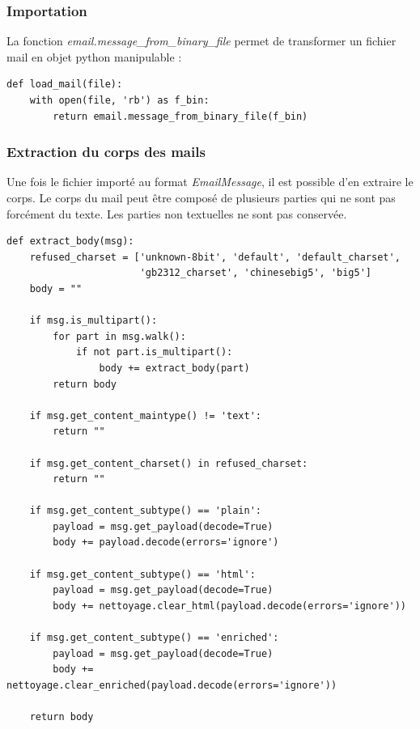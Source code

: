	\subsubsection{Importation}
		La fonction \emph{email.message\_from\_binary\_file} permet de transformer un fichier mail en objet python manipulable :
		\begin{lstlisting}[title=Fonction d'importation des fichiers,label={lst:import_file}]
def load_mail(file):
    with open(file, 'rb') as f_bin:
        return email.message_from_binary_file(f_bin)
		\end{lstlisting}

    \subsubsection{Extraction du corps des mails}
		Une fois le fichier importé au format \emph{EmailMessage}, il est possible d'en extraire le corps.
		Le corps du mail peut être composé de plusieurs parties qui ne sont pas forcément du texte.
		Les parties non textuelles ne sont pas conservée.

		\begin{lstlisting}[title=Extraction du corps du mail,label={lst:extract_corps}]
def extract_body(msg):
    refused_charset = ['unknown-8bit', 'default', 'default_charset',
                       'gb2312_charset', 'chinesebig5', 'big5']
    body = ""

    if msg.is_multipart():
        for part in msg.walk():
            if not part.is_multipart():
                body += extract_body(part)
        return body

    if msg.get_content_maintype() != 'text':
        return ""

    if msg.get_content_charset() in refused_charset:
        return ""

    if msg.get_content_subtype() == 'plain':
        payload = msg.get_payload(decode=True)
        body += payload.decode(errors='ignore')

    if msg.get_content_subtype() == 'html':
        payload = msg.get_payload(decode=True)
        body += nettoyage.clear_html(payload.decode(errors='ignore'))

    if msg.get_content_subtype() == 'enriched':
        payload = msg.get_payload(decode=True)
        body += nettoyage.clear_enriched(payload.decode(errors='ignore'))

    return body
		\end{lstlisting}

